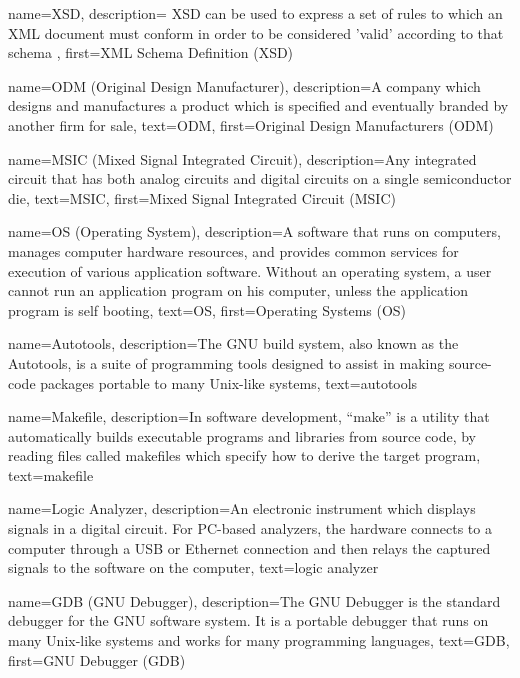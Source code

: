 {
  name=XSD,
  description={
    XSD can be used to express a set of rules to which an XML document must
    conform in order to be considered 'valid' according to that schema
  },
  first=XML Schema Definition (XSD)
}

{
  name=ODM (Original Design Manufacturer),
  description={A company which designs and manufactures a product
    which is specified and eventually branded by another firm for
    sale},
  text=ODM,
  first=Original Design Manufacturers (ODM)
}

{
  name=MSIC (Mixed Signal Integrated Circuit),
  description={Any integrated circuit that has both analog circuits
    and digital circuits on a single semiconductor die},
  text=MSIC,
  first=Mixed Signal Integrated Circuit (MSIC)
}

{
  name=OS (Operating System),
  description={A software that runs on computers, manages computer
    hardware resources, and provides common services for execution of
    various application software. Without an operating system, a user
    cannot run an application program on his computer, unless the
    application program is self booting},
  text=OS,
  first=Operating Systems (OS)
}

{
  name=Autotools,
  description={The GNU build system, also known as the Autotools, is a
    suite of programming tools designed to assist in making
    source-code packages portable to many Unix-like systems},
  text=autotools
}

{
  name=Makefile,
  description={In software development, ``make'' is a utility that
    automatically builds executable programs and libraries from source
    code, by reading files called makefiles which specify how to
    derive the target program},
  text=makefile
}

{
  name=Logic Analyzer,
  description={An electronic instrument which displays signals in a
    digital circuit. For PC-based analyzers, the hardware connects to
    a computer through a USB or Ethernet connection and then relays
    the captured signals to the software on the computer},
  text=logic analyzer
}

{
  name=GDB (GNU Debugger),
  description={The GNU Debugger is the standard debugger for the GNU
    software system. It is a portable debugger that runs on many
    Unix-like systems and works for many programming languages},
  text=GDB,
  first=GNU Debugger (GDB)
}

